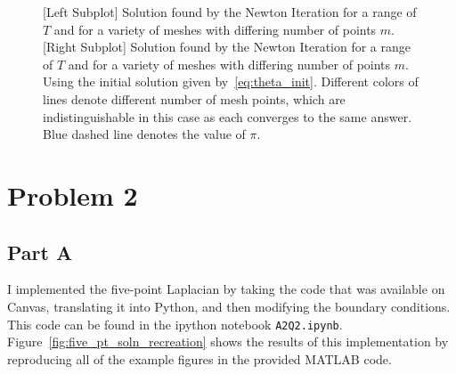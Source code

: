 \documentclass[12pt]{article}
\begin{document}
\begin{figure}
    \centering
    \caption{
        [Left Subplot] Solution found by the Newton Iteration for a range of $T$ and for a variety of meshes with differing number of points $m$. [Right Subplot] Solution found by the Newton Iteration for a range of $T$ and for a variety of meshes with differing number of points $m$. Using the initial solution given by~\eqref{eq:theta_init}. Different colors of lines denote different number of mesh points, which are indistinguishable in this case as each converges to the same answer. 
        Blue dashed line denotes the value of $\pi$.
    }
    \label{fig:q1b_scan}
\end{figure}

\section*{Problem 2}

\subsection*{Part A}
I implemented the five-point Laplacian by taking the code that was available on Canvas, translating it into Python, and then modifying the boundary conditions.
This code can be found in the ipython notebook \verb|A2Q2.ipynb|. Figure~\ref{fig:five_pt_soln_recreation} shows the results of this implementation by reproducing all of the example figures in the provided MATLAB code. 
\end{document}
